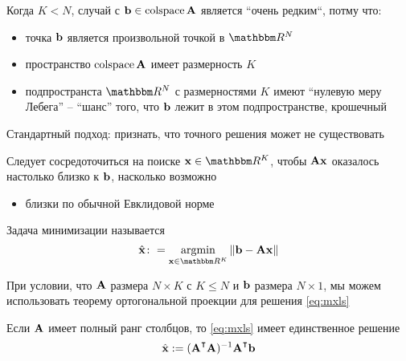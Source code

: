 \begin{frame}

     \vspace{2em}
    Когда $K < N$, случай с ${\mathbf b} \in
    \operatorname{colspace} \mathbf A$ является ``очень редким``, потму что:
    \begin{itemize}
        \item точка ${\mathbf b}$ является произвольной точкой в $\RR^N$
        \item пространство $ \operatorname{colspace} \mathbf A$ имеет размерность $K$
        \item подпространста $\RR^N$ с размерностями $K$ имеют
        ``нулевую меру Лебега'' -- ``шанс'' того, что ${\mathbf b}$ лежит в 
        этом подпространстве, крошечный
    \end{itemize}
    
\end{frame}

\begin{frame}

     \vspace{2em}
    Стандартный подход: признать, что точного решения может не существовать
    
    \vspace{1em}
    Следует сосредоточиться на поиске $\boldx \in \RR^K$, чтобы $\mathbf A
    {\mathbf x}$ оказалось настолько близко к ${\mathbf b}$, насколько возможно
    \begin{itemize}
        \item близки по обычной Евклидовой норме
    \end{itemize}
    
    \vspace{1em}
    Задача минимизации называется 
    \begin{equation}
        \label{eq:mxls}
        \hat{\boldx} \colon = \argmin_{\boldx \in \RR^K} \| \boldb - \boldA \boldx \|
    \end{equation}
    
\end{frame}


\begin{frame}

     \vspace{2em}
    При условии, что $\mathbf A$ размера $N \times K$ с $K \leq N$ и 
    ${\mathbf b}$ размера $N \times 1$, 
    мы можем использовать теорему ортогональной проекции для решения \eqref{eq:mxls}
    
    \vspace{.7em}
    \Thm{\eqref{ET-t:lssol}}
        Если $\mathbf A$ имеет полный ранг столбцов, то \eqref{eq:mxls} имеет 
        единственное решение
        \begin{equation}
            \label{eq:dlse}
            \hboldx := (\boldA^\T \boldA)^{-1} \boldA^\T \boldb
        \end{equation}
    \end{frame}
    
